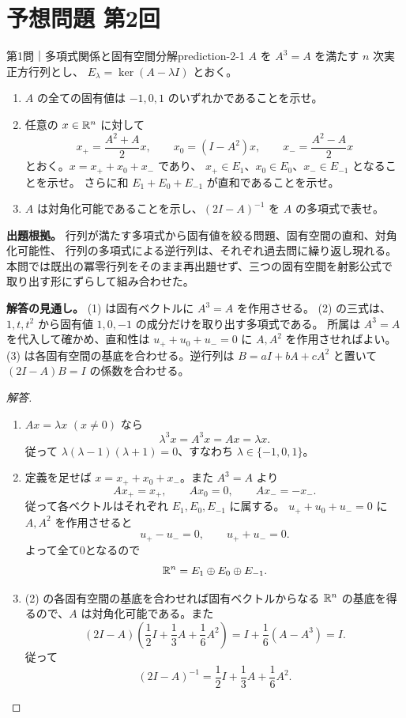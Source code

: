 \section{予想問題 第2回}

\begin{problem}{第1問｜多項式関係と固有空間分解}{prediction-2-1}
$A$ を $A^3=A$ を満たす $n$ 次実正方行列とし、
$E_\lambda=\ker(A-\lambda I)$ とおく。
\begin{enumerate}
  \item[(1)] $A$ の全ての固有値は $-1,0,1$ のいずれかであることを示せ。
  \item[(2)] 任意の $x\in\mathbb{R}^n$ に対して
  \[
  x_+=\frac{A^2+A}{2}x,\qquad
  x_0=(I-A^2)x,\qquad
  x_- =\frac{A^2-A}{2}x
  \]
  とおく。$x=x_++x_0+x_-$ であり、
  $x_+\in E_1$、$x_0\in E_0$、$x_-\in E_{-1}$ となることを示せ。
  さらに和 $E_1+E_0+E_{-1}$ が直和であることを示せ。
  \item[(3)] $A$ は対角化可能であることを示し、$(2I-A)^{-1}$ を
  $A$ の多項式で表せ。
\end{enumerate}
\end{problem}
\begin{memo*}
\textbf{出題根拠。}
行列が満たす多項式から固有値を絞る問題、固有空間の直和、対角化可能性、
行列の多項式による逆行列は、それぞれ過去問に繰り返し現れる。
本問では既出の冪零行列をそのまま再出題せず、三つの固有空間を射影公式で
取り出す形にずらして組み合わせた。

\textbf{解答の見通し。}
(1) は固有ベクトルに $A^3=A$ を作用させる。
(2) の三式は、$1,t,t^2$ から固有値 $1,0,-1$ の成分だけを取り出す多項式である。
所属は $A^3=A$ を代入して確かめ、直和性は
$u_++u_0+u_-=0$ に $A,A^2$ を作用させればよい。
(3) は各固有空間の基底を合わせる。逆行列は
$B=aI+bA+cA^2$ と置いて $(2I-A)B=I$ の係数を合わせる。
\end{memo*}
\begin{proof}[解答]
\begin{enumerate}
  \item[(1)] $Ax=\lambda x$ $(x\ne0)$ なら
  \[
  \lambda^3x=A^3x=Ax=\lambda x.
  \]
  従って $\lambda(\lambda-1)(\lambda+1)=0$、すなわち
  $\lambda\in\{-1,0,1\}$。

  \item[(2)] 定義を足せば $x=x_++x_0+x_-$。また $A^3=A$ より
  \[
  Ax_+=x_+,\qquad Ax_0=0,\qquad Ax_-=-x_-.
  \]
  従って各ベクトルはそれぞれ $E_1,E_0,E_{-1}$ に属する。
  $u_++u_0+u_-=0$ に $A,A^2$ を作用させると
  \[
  u_+-u_-=0,\qquad u_++u_-=0.
  \]
  よって全て0となるので
  \[
  \mathbb{R}^n=E_1\oplus E_0\oplus E_{-1}.
  \]

  \item[(3)] (2) の各固有空間の基底を合わせれば固有ベクトルからなる
  $\mathbb{R}^n$ の基底を得るので、$A$ は対角化可能である。また
  \[
  (2I-A)\left(\frac12I+\frac13A+\frac16A^2\right)
  =I+\frac16(A-A^3)=I.
  \]
  従って
  \[
  (2I-A)^{-1}=\frac12I+\frac13A+\frac16A^2.
  \]
\end{enumerate}
\end{proof}


